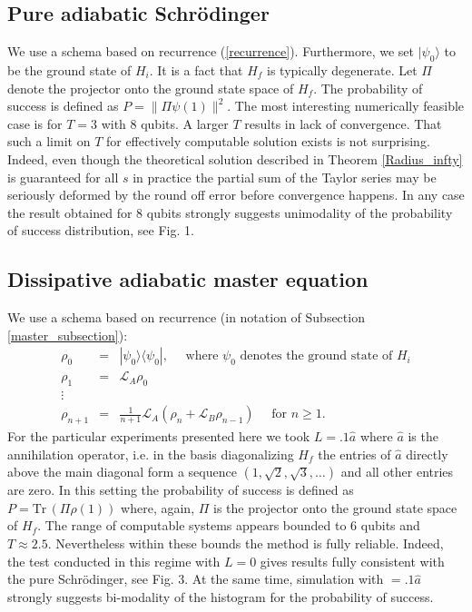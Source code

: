 \documentclass[11 pt]{article}
\begin{document}
\subsection{Pure adiabatic Schr\"{o}dinger}

We use a schema based on recurrence (\ref{recurrence}). Furthermore, we set $|\psi_0\rangle$ to be the ground state of $H_i$. It is a fact that $H_f$ is typically degenerate. Let $\Pi$ denote the projector onto the ground state space of $H_f$. The probability of success is defined as $P = \|\Pi\psi(1)\|^2$. The most interesting numerically feasible case is for $T=3$ with 8 qubits. A larger $T$ results in lack of convergence. That such a limit on $T$ for effectively computable solution exists is not surprising. Indeed, even though the theoretical solution described in Theorem \ref{Radius_infty} is guaranteed for all $s$ in practice the partial sum of the Taylor series may be seriously deformed by the round off error before convergence happens. In any case the result obtained for 8 qubits strongly suggests unimodality of the probability of success distribution, see Fig. 1.


\subsection{Dissipative adiabatic master equation}

We use a schema  based on recurrence (in notation of Subsection \ref{master_subsection}):
\begin{equation}\label{recurrence_Q_rho}
\begin{array}{lll}
\rho_0 &=& |\psi_0\rangle\langle \psi_0|,\quad \mbox{ where $\psi_0$ denotes the ground state of } H_i \\
\rho_1  &=& \mathcal{L}_A \rho_0 \\
\vdots & &\\
\rho_{n+1} & = & \frac{1}{n+1}\mathcal{L}_A\left( \rho_n + \mathcal{L}_B \rho_{n-1}\right)\quad \mbox{ for } n\geq 1.
\end{array}
\end{equation}
 For the particular experiments presented here we took $L = .1\hat{a}$ where $\hat{a}$ is the annihilation operator, i.e. in the basis diagonalizing $H_f$  the entries of $\hat{a}$ directly above the main diagonal form a sequence $(1, \sqrt{2}, \sqrt{3}, \ldots)$ and all other entries are zero. In this setting the probability of success is defined as $P = \mbox{Tr}\,(\Pi \rho(1))$ where, again, $\Pi$ is the projector onto the ground state space of $H_f$. The range of computable systems appears bounded to 6 qubits and $T \approx 2.5$. Nevertheless within these bounds the method is  fully reliable. Indeed, the test conducted  in this regime with $L=0$ gives results fully consistent with the pure Schr\"{o}dinger, see Fig. 3. At the same time, simulation with $=.1\hat{a}$ strongly suggests bi-modality of the histogram for the probability of success.
\end{document}
